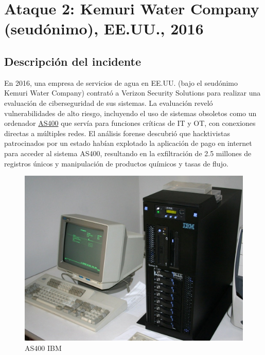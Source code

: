 \section{Ataque 2: Kemuri Water Company (seudónimo), EE.UU., 2016}

\subsection{Descripción del incidente}
\begin{paracol}{2}
    \colfill
    En 2016, una empresa de servicios de agua en EE.UU. (bajo el seudónimo Kemuri Water Company) contrató a Verizon Security Solutions para realizar una evaluación de ciberseguridad de sus sistemas. La evaluación reveló vulnerabilidades de alto riesgo, incluyendo el uso de sistemas obsoletos como un ordenador \href{https://it.wikipedia.org/wiki/IBM_AS/400}{AS400} que servía para funciones críticas de IT y OT, con conexiones directas a múltiples redes. El análisis forense descubrió que hacktivistas patrocinados por un estado habían explotado la aplicación de pago en internet para acceder al sistema AS400, resultando en la exfiltración de 2.5 millones de registros únicos y manipulación de productos químicos y tasas de flujo.
    \colfill
    
    \switchcolumn

    \begin{figure}[htbp]
        \centering
        \includegraphics[width=0.95\columnwidth]{images/AS400.jpg}
        \caption{AS400 IBM}
        \label{fig:AS400}
    \end{figure}
\end{paracol}
